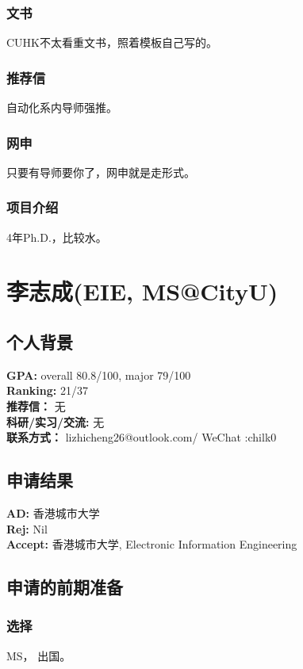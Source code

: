 \documentclass[a4paper,UTF8]{book}
\begin{document}
        \subsubsection*{文书}
        CUHK不太看重文书，照着模板自己写的。

        \subsubsection*{推荐信}
        自动化系内导师强推。

        \subsubsection*{网申}
        只要有导师要你了，网申就是走形式。

        \subsubsection*{项目介绍}
        4年Ph.D.，比较水。


\clearpage
\section{李志成(EIE, MS@CityU)}
    \subsection*{个人背景}
        \textbf{GPA:} overall 80.8/100, major 79/100\\
        \textbf{Ranking:} 21/37\\
        \textbf{推荐信：} 无\\
        \textbf{科研/实习/交流:} 无\\ 
        \textbf{联系方式：} lizhicheng26@outlook.com/ WeChat :chilk0

    \subsection*{申请结果}
        \textbf{AD:} 香港城市大学\\
        \textbf{Rej:} Nil\\
        \textbf{Accept:} 香港城市大学, Electronic Information Engineering

    \subsection*{申请的前期准备}
        \subsubsection*{选择}
        MS， 出国。
\end{document}
